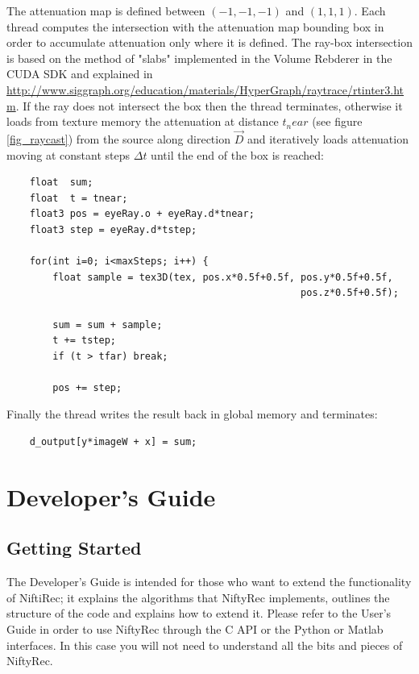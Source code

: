 \documentclass[12pt,a4paper]{report}
\begin{document}
\noindent The attenuation map is defined between $(-1,-1,-1)$ and $(1,1,1)$. Each thread computes the intersection with the 
attenuation map bounding box in order to accumulate attenuation only where it is defined. The ray-box intersection 
is based on the method of "slabs" implemented in the Volume Rebderer in the CUDA SDK and explained in 
\url{http://www.siggraph.org/education/materials/HyperGraph/raytrace/rtinter3.htm}. 
If the ray does not intersect the box then the thread terminates, otherwise it loads from texture memory the attenuation 
at distance $t_near$ (see figure \ref{fig_raycast}) from the source along direction $\vec{D}$ and iteratively loads attenuation 
moving at constant steps $\Delta t$ until the end of the box is reached: 

\vspace{5mm}
\lstset{language=C,basicstyle=\scriptsize}
\begin{lstlisting}
    float  sum; 
    float  t = tnear;
    float3 pos = eyeRay.o + eyeRay.d*tnear;
    float3 step = eyeRay.d*tstep;

    for(int i=0; i<maxSteps; i++) {
        float sample = tex3D(tex, pos.x*0.5f+0.5f, pos.y*0.5f+0.5f, 
                                                   pos.z*0.5f+0.5f);

        sum = sum + sample;
        t += tstep;
        if (t > tfar) break;

        pos += step;
\end{lstlisting}
\vspace{5mm}

\noindent Finally the thread writes the result back in global memory and terminates: 

\vspace{5mm}
\lstset{language=C,basicstyle=\scriptsize}
\begin{lstlisting}
    d_output[y*imageW + x] = sum;
\end{lstlisting}
\vspace{5mm}





\chapter{Developer's Guide}

\section{Getting Started}
The Developer's Guide is intended for those who want to extend the functionality of NiftiRec; 
it explains the algorithms that NiftyRec implements, outlines the structure of the code and explains 
how to extend it. Please refer to the User's Guide in order to use NiftyRec through the C API or the Python or Matlab interfaces. 
In this case you will not need to understand all the bits and pieces of NiftyRec. \\
\end{document}
